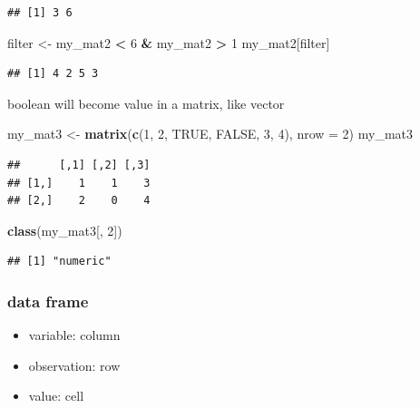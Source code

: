 \documentclass[
]{book}
\newenvironment{Shaded}{\begin{snugshade}}{\end{snugshade}}
\newcommand{\AttributeTok}[1]{\textcolor[rgb]{0.13,0.29,0.53}{#1}}
\newcommand{\ConstantTok}[1]{\textcolor[rgb]{0.56,0.35,0.01}{#1}}
\newcommand{\DecValTok}[1]{\textcolor[rgb]{0.00,0.00,0.81}{#1}}
\newcommand{\FunctionTok}[1]{\textcolor[rgb]{0.13,0.29,0.53}{\textbf{#1}}}
\newcommand{\NormalTok}[1]{#1}
\newcommand{\OtherTok}[1]{\textcolor[rgb]{0.56,0.35,0.01}{#1}}
\newcommand{\SpecialCharTok}[1]{\textcolor[rgb]{0.81,0.36,0.00}{\textbf{#1}}}
\providecommand{\tightlist}{%
  \setlength{\itemsep}{0pt}\setlength{\parskip}{0pt}}
\theoremstyle{definition}
\theoremstyle{definition}
\theoremstyle{definition}
\theoremstyle{definition}
\theoremstyle{remark}
\begin{document}
\begin{verbatim}
## [1] 3 6
\end{verbatim}

\begin{Shaded}
\begin{Highlighting}[]
\NormalTok{filter }\OtherTok{\textless{}{-}}\NormalTok{ my\_mat2 }\SpecialCharTok{\textless{}} \DecValTok{6} \SpecialCharTok{\&}\NormalTok{ my\_mat2 }\SpecialCharTok{\textgreater{}} \DecValTok{1}
\NormalTok{my\_mat2[filter]}
\end{Highlighting}
\end{Shaded}

\begin{verbatim}
## [1] 4 2 5 3
\end{verbatim}

boolean will become value in a matrix, like vector

\begin{Shaded}
\begin{Highlighting}[]
\NormalTok{my\_mat3 }\OtherTok{\textless{}{-}} \FunctionTok{matrix}\NormalTok{(}\FunctionTok{c}\NormalTok{(}\DecValTok{1}\NormalTok{, }\DecValTok{2}\NormalTok{, }\ConstantTok{TRUE}\NormalTok{, }\ConstantTok{FALSE}\NormalTok{, }\DecValTok{3}\NormalTok{, }\DecValTok{4}\NormalTok{), }\AttributeTok{nrow =} \DecValTok{2}\NormalTok{)}
\NormalTok{my\_mat3}
\end{Highlighting}
\end{Shaded}

\begin{verbatim}
##      [,1] [,2] [,3]
## [1,]    1    1    3
## [2,]    2    0    4
\end{verbatim}

\begin{Shaded}
\begin{Highlighting}[]
\FunctionTok{class}\NormalTok{(my\_mat3[, }\DecValTok{2}\NormalTok{])}
\end{Highlighting}
\end{Shaded}

\begin{verbatim}
## [1] "numeric"
\end{verbatim}

\subsubsection{data frame}\label{data-frame}

\begin{itemize}
\tightlist
\item
  variable: column
\item
  observation: row
\item
  value: cell
\end{itemize}
\end{document}

